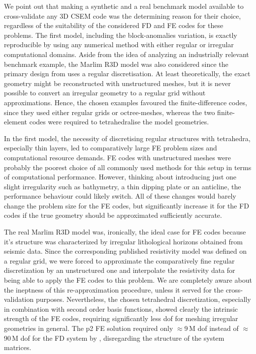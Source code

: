 \documentclass[
    paper,
  ]{geophysics}
\begin{document}
We point out that making a synthetic and a real benchmark model available to
cross-validate any 3D CSEM code was the determining reason for their choice,
regardless of the suitability of the considered FD and FE codes for these
problems. The first model, including the block-anomalies variation, is exactly
reproducible by using any numerical method with either regular or irregular
computational domains. Aside from the idea of analyzing an industrially
relevant benchmark example, the Marlim R3D model was also considered since the
primary design from \cite{GEO.19.Correa} uses a regular discretisation. At
least theoretically, the exact geometry might be reconstructed with
unstructured meshes, but it is never possible to convert an irregular geometry
to a regular grid without approximations. Hence, the chosen examples favoured
the finite-difference codes, since they used either regular grids or
octree-meshes, whereas the two finite-element codes were required to
tetrahedralise the model geometries.

In the first model, the necessity of discretising regular structures with
tetrahedra, especially thin layers, led to comparatively large FE problem sizes
and computational resource demands. FE codes with unstructured meshes were
probably the poorest choice of all commonly used methods for this setup in
terms of computational performance. However, thinking about introducing just
one slight irregularity such as bathymetry, a thin dipping plate or an
anticline, the performance behaviour could likely switch. All of these changes
would barely change the problem size for the FE codes, but significantly
increase it for the FD codes if the true geometry should be approximated
sufficiently accurate.

The real Marlim R3D model was, ironically, the ideal case for FE codes because
it's structure was characterized by irregular lithological horizons obtained
from seismic data. Since the corresponding published resistivity model was
defined on a regular grid, we were forced to approximate the comparatively fine
regular discretization by an unstructured one and interpolate the resistivity
data for being able to apply the FE codes to this problem. We are completely
aware about the ineptness of this re-approximation procedure, unless it served
for the cross-validation purposes. Nevertheless, the chosen tetrahedral
discretization, especially in combination with second order basis functions,
showed clearly the intrinsic strength of the FE codes, requiring significantly
less dof for meshing irregular geometries in general. The p2 FE solution
required only $\approx$9\,M dof instead of $\approx$90\,M dof for the FD system
by \citet{GEO.19.Correa}, disregarding the structure of the system matrices.
\end{document}
